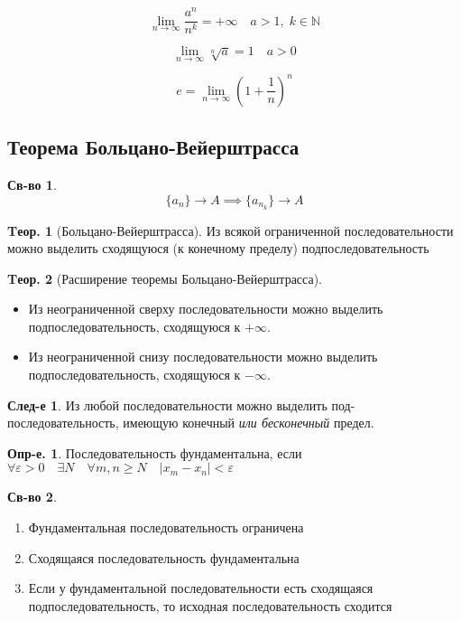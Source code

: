 \documentclass[a4paper,12pt]{article}
\numberwithin{figure}{section}
\theoremstyle{definition}
\newtheorem{definition}{Опр-е.}[section]
\newtheorem*{property}{Св-во}  %
\theoremstyle{definition}
\newtheorem{theorem}{Tеор.}[section]
\newtheorem*{corollary}{След-е} %
\def\eps{\varepsilon}
\def\ntoinf{n \to \infty}
\def\mathN{\mathbb{N}}
\def\geqs{\geqslant}
\begin{document}
\[ \lim_{\ntoinf} \frac{a^n}{n^k} = +\infty \quad a>1, \; k \in \mathN \]

\[ \lim_{\ntoinf} \sqrt[n]{a} = 1 \quad a>0 \]

\[ e = \lim_{\ntoinf}\left( 1 + \frac1n \right)^n \]


\subsection{Теорема Больцано-Вейерштрасса}

\begin{property}
	\[ \{ a_n \} \to A \implies \{ a_{n_k} \} \to A \]
\end{property}

\begin{theorem}[Больцано-Вейерштрасса]
	Из всякой ограниченной последовательности можно выделить сходящуюся (к конечному пределу) подпоследовательность
\end{theorem}

\begin{theorem}[Расширение теоремы Больцано-Вейерштрасса]  \ \\
	\begin{itemize}
		\item Из неограниченной сверху последовательности можно выделить подпоследовательность, сходящуюся к $+\infty$.
		\item Из неограниченной снизу последовательности можно выделить подпоследовательность, сходящуюся к $-\infty$.
	\end{itemize}
\end{theorem}

\begin{corollary}
	Из любой последовательности можно выделить под-последовательность, имеющую конечный \textit{или бесконечный} предел.
\end{corollary}

\begin{definition}
	Последовательность фундаментальна, если
	$\forall \eps>0 \quad \exists N \quad \forall m,n \geqs N \quad |x_m - x_n|<\eps$
\end{definition}

\begin{property} \ \\
	\begin{enumerate}
		\item Фундаментальная последовательность ограничена
		\item Сходящаяся последовательность фундаментальна
		\item Если у фундаментальной последовательности есть сходящаяся подпоследовательность, то исходная последовательность сходится
	\end{enumerate}
\end{property}
\end{document}
